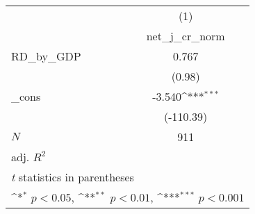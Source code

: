 {
\def\sym#1{\ifmmode^{#1}\else\(^{#1}\)\fi}
\begin{tabular}{l*{1}{c}}
\toprule
            &\multicolumn{1}{c}{(1)}\\
            &\multicolumn{1}{c}{net\_j\_cr\_norm}\\
\midrule
RD\_by\_GDP   &       0.767         \\
            &      (0.98)         \\
\addlinespace
\_cons      &      -3.540\sym{***}\\
            &   (-110.39)         \\
\midrule
\(N\)       &         911         \\
adj. \(R^{2}\)&                     \\
\bottomrule
\multicolumn{2}{l}{\footnotesize \textit{t} statistics in parentheses}\\
\multicolumn{2}{l}{\footnotesize \sym{*} \(p<0.05\), \sym{**} \(p<0.01\), \sym{***} \(p<0.001\)}\\
\end{tabular}
}
